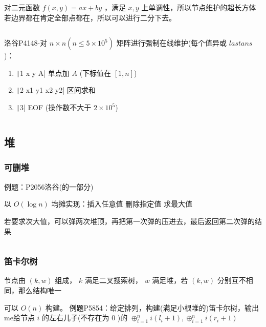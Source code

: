 \documentclass[twocolumn,10pt]{ctexart}
\newcommand{\cds}[1]{\ding{\numexpr191+#1\relax}}
\begin{document}
对二元函数 $f(x,y)=ax+by$ ，满足 $x,y$ 上单调性，所以节点维护的超长方体若边界都在肯定全部点都在，所以可以进行二分下去。

\inputminted{cpp}{code/p4475_kd_tree.cpp}

\begin{notebox}
洛谷P4148-对 $n\times n(n\le5\times 10^5)$ 矩阵进行强制在线维护(每个值异或 $lastans$ )：

\begin{enumerate}
\item \texttt|1 x y A| 单点加 $A$ (下标值在 $[1,n]$)
\item \texttt|2 x1 y1 x2 y2| 区间求和
\item \texttt|3| EOF (操作数不大于 $2\times10^5$)
\end{enumerate}
\end{notebox}

\inputminted{cpp}{code/p4148_kd_tree.cpp}

\subsection{堆}

\subsubsection{可删堆}

\begin{notebox}
例题：P2056洛谷(的一部分)
\end{notebox}

以 $O(\log n)$ 均摊实现：\cds{1}插入任意值 \cds{2}删除指定值 \cds{3}求最大值

\begin{notebox}
若要求次大值，可以弹两次堆顶，再把第一次弹的压进去，最后返回第二次弹的结果
\end{notebox}

\inputminted{cpp}{code/ext_025.cpp}

\subsubsection{笛卡尔树}

节点由 $(k,w)$ 组成， $k$ 满足二叉搜索树， $w$ 满足堆，若 $(k,w)$ 分别互不相同，那么结构唯一

可以 $O(n)$ 构建。 例题P5854：给定排列，构建(满足小根堆的)笛卡尔树，输出me给节点 $i$ 的左右儿子(不存在为 $0$ )的 $\oplus_{i=1}^ni(l_i+1),\allowbreak{}\oplus_{i=1}^ni(r_i+1)$
\end{document}
